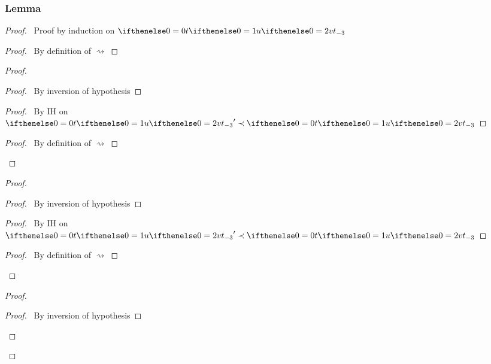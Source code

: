 \documentclass[a4paper]{article}
\begin{document}
\subsubsection{Lemma}\label{lemma-neutral-term}
\begin{proof}
  \prove{$\betaNormal{\aTerm}$}
  \pfsketch\ Proof by induction on $\aTerm$
  \begin{proof}
    \pf\ By definition of $\rightsquigarrow$
  \end{proof}
  \begin{proof}
    \begin{proof}
      \pf\ By inversion of hypothesis
    \end{proof}
    \begin{proof}
      \pf\ By IH on $\aTerm' \prec \aTerm$
    \end{proof}
    \qedstep
    \begin{proof}
      \pf\ By definition of $\rightsquigarrow$
    \end{proof}
  \end{proof}
  \begin{proof}
    \begin{proof}
      \pf\ By inversion of hypothesis
    \end{proof}
    \begin{proof}
      \pf\ By IH on $\aTerm' \prec \aTerm$
    \end{proof}
    \qedstep
    \begin{proof}
      \pf\ By definition of $\rightsquigarrow$
    \end{proof}
  \end{proof}
  \begin{proof}
    \begin{proof}
      \pf\ By inversion of hypothesis
    \end{proof}

\end{proof}
\end{proof}
\end{document}
